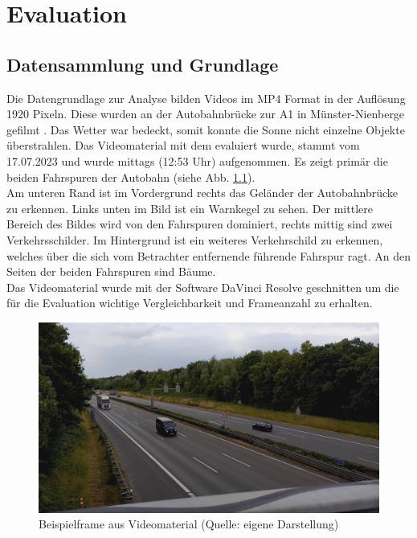 \chapter{Evaluation}
\label{ch:Evaluation}
\section{Datensammlung und Grundlage}
{
	Die Datengrundlage zur Analyse bilden Videos im MP4 Format in der Auflösung 1920  Pixeln. Diese wurden an der Autobahnbrücke zur A1 in Münster-Nienberge gefilmt \citep{GMaps}. Das Wetter war bedeckt, somit konnte die Sonne nicht einzelne Objekte überstrahlen. Das Videomaterial mit dem evaluiert wurde, stammt vom 17.07.2023 und wurde mittags (12:53 Uhr) aufgenommen. Es zeigt primär die beiden Fahrspuren der Autobahn (siehe Abb. \ref{Bsp_Evaluations_Vidmat}). \\
	Am unteren Rand ist im Vordergrund rechts das Geländer der Autobahnbrücke zu erkennen. Links unten im Bild ist ein Warnkegel zu sehen. Der mittlere Bereich des Bildes wird von den Fahrspuren dominiert, rechts mittig sind zwei Verkehrsschilder. Im Hintergrund ist ein weiteres Verkehrschild zu erkennen, welches über die sich vom Betrachter entfernende führende Fahrspur ragt. An den Seiten der beiden Fahrspuren sind Bäume. \\
	Das Videomaterial wurde mit der Software DaVinci Resolve \citep{davinciresolve} geschnitten um die für die Evaluation wichtige Vergleichbarkeit und Frameanzahl zu erhalten.
	\begin{figure}[ht]
		\centering
		\includegraphics*[scale = 0.35, keepaspectratio ]{images/Evaluation/Screenshot_Video_A10s.png}
		\caption[Beispielframe aus Videomaterial]{Beispielframe aus Videomaterial (Quelle: eigene Darstellung)} 
		\label{Bsp_Evaluations_Vidmat}
 \end{figure}
}


